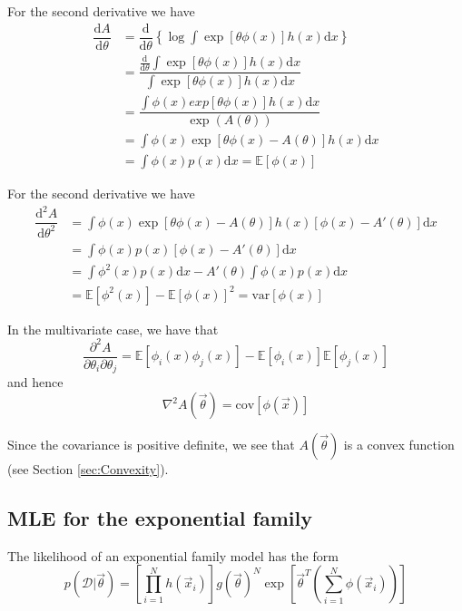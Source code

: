 \begin{refsection}
For the second derivative we have
\begin{align}
\dfrac{\mathrm{d} A}{\mathrm{d} \theta} & = \dfrac{\mathrm{d}}{\mathrm{d} \theta}\left\{\log\int\exp\left[\theta\phi(x)\right]h(x)\mathrm{d}x\right\} \nonumber \\
& = \dfrac{\frac{\mathrm{d}}{\mathrm{d} \theta}\int\exp\left[\theta\phi(x)\right]h(x)\mathrm{d}x}{\int\exp\left[\theta\phi(x)\right]h(x)\mathrm{d}x} \nonumber \\
& = \dfrac{\int\phi(x)exp\left[\theta\phi(x)\right]h(x)\mathrm{d}x}{\exp(A(\theta))} \nonumber \\
& = \int \phi(x)\exp\left[\theta\phi(x)-A(\theta)\right]h(x)\mathrm{d}x \nonumber \\
& = \int \phi(x)p(x)\mathrm{d}x=\mathbb{E}[\phi(x)]
\end{align}

For the second derivative we have
\begin{align}
\dfrac{\mathrm{d}^2 A}{\mathrm{d} \theta^2} & = \int \phi(x)\exp\left[\theta\phi(x)-A(\theta)\right]h(x)\left[\phi(x)-A'(\theta)\right]\mathrm{d}x \nonumber \\
& = \int \phi(x)p(x)\left[\phi(x)-A'(\theta)\right]\mathrm{d}x \nonumber \\
& = \int \phi^2(x)p(x)\mathrm{d}x-A'(\theta)\int \phi(x)p(x)\mathrm{d}x \nonumber \\
& = \mathbb{E}[\phi^2(x)]-\mathbb{E}[\phi(x)]^2=\mathrm{var}[\phi(x)]
\end{align}

In the multivariate case, we have that
\begin{equation}
\dfrac{\partial^2 A}{\partial \theta_i \partial \theta_j}=\mathbb{E}[\phi_i(x)\phi_j(x)]-\mathbb{E}[\phi_i(x)]\mathbb{E}[\phi_j(x)]
\end{equation}
and hence
\begin{equation}
\nabla^2A(\vec{\theta}) = \mathrm{cov}[\phi(\vec{x})]
\end{equation}

Since the covariance is positive definite, we see that $A(\vec{\theta})$ is a convex function (see Section \ref{sec:Convexity}).


\subsection{MLE for the exponential family}
The likelihood of an exponential family model has the form
\begin{equation}
p(\mathcal{D}|\vec{\theta})=\left[\prod\limits_{i=1}^N h(\vec{x}_i)\right]g(\vec{\theta})^N\exp\left[\vec{\theta}^T\left(\sum\limits_{i=1}^N \phi(\vec{x}_i)\right)\right]
\end{equation}


\end{refsection}
